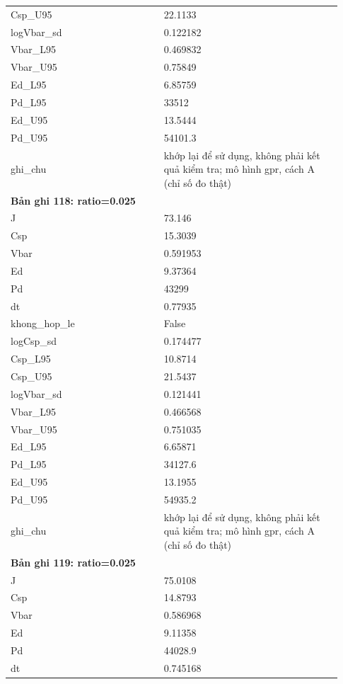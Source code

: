 \begin{longtable}{p{0.43\linewidth}p{0.50\linewidth}}
Csp\_\allowbreak U95 & 22.1133 \\
logVbar\_\allowbreak sd & 0.122182 \\
Vbar\_\allowbreak L95 & 0.469832 \\
Vbar\_\allowbreak U95 & 0.75849 \\
Ed\_\allowbreak L95 & 6.85759 \\
Pd\_\allowbreak L95 & 33512 \\
Ed\_\allowbreak U95 & 13.5444 \\
Pd\_\allowbreak U95 & 54101.3 \\
ghi\_\allowbreak chu & khớp lại để sử dụng, không phải kết quả kiểm tra; mô hình gpr, cách A (chỉ số đo thật) \\
\midrule
\multicolumn{2}{p{0.95\linewidth}}{\textbf{Bản ghi 118: ratio=0.025}} \\
J & 73.146 \\
Csp & 15.3039 \\
Vbar & 0.591953 \\
Ed & 9.37364 \\
Pd & 43299 \\
dt & 0.77935 \\
khong\_\allowbreak hop\_\allowbreak le & False \\
logCsp\_\allowbreak sd & 0.174477 \\
Csp\_\allowbreak L95 & 10.8714 \\
Csp\_\allowbreak U95 & 21.5437 \\
logVbar\_\allowbreak sd & 0.121441 \\
Vbar\_\allowbreak L95 & 0.466568 \\
Vbar\_\allowbreak U95 & 0.751035 \\
Ed\_\allowbreak L95 & 6.65871 \\
Pd\_\allowbreak L95 & 34127.6 \\
Ed\_\allowbreak U95 & 13.1955 \\
Pd\_\allowbreak U95 & 54935.2 \\
ghi\_\allowbreak chu & khớp lại để sử dụng, không phải kết quả kiểm tra; mô hình gpr, cách A (chỉ số đo thật) \\
\midrule
\multicolumn{2}{p{0.95\linewidth}}{\textbf{Bản ghi 119: ratio=0.025}} \\
J & 75.0108 \\
Csp & 14.8793 \\
Vbar & 0.586968 \\
Ed & 9.11358 \\
Pd & 44028.9 \\
dt & 0.745168 \\

\end{longtable}
